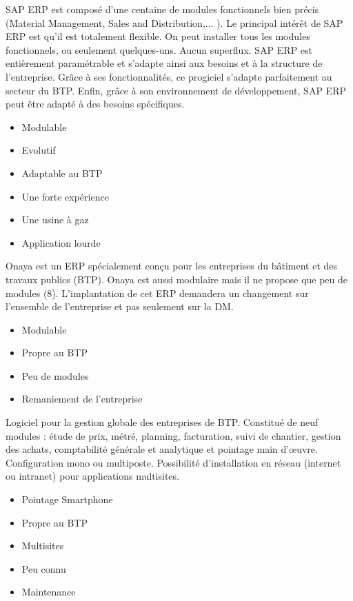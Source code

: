 {
    SAP ERP est composé d'une centaine de modules fonctionnels bien précis (Material Management, Sales and Distribution,... ).
    Le principal intérêt de SAP ERP est qu'il est totalement flexible. On peut installer tous les modules fonctionnels, ou seulement quelques-uns.
    Aucun superflux. SAP ERP est entièrement paramétrable et s'adapte ainsi aux besoins et à la structure de l'entreprise.
    Grâce à ses fonctionnalités, ce progiciel s'adapte parfaitement au secteur du BTP.
    Enfin, grâce à son environnement de développement, SAP ERP peut être adapté à des besoins spécifiques.
}
{
    \begin{itemize}
        \item Modulable
        \item Evolutif
        \item Adaptable au BTP
        \item Une forte expérience
    \end{itemize}
}
{
    \begin{itemize}
        \item Une usine à gaz
        \item Application lourde
    \end{itemize}
}



{
    Onaya est un ERP spécialement conçu pour les entreprises du bâtiment et des travaux publics (BTP).
    Onaya est aussi modulaire mais il ne propose que peu de modules (8).
    L'implantation de cet ERP demandera un changement sur l'ensemble de l'entreprise et pas seulement sur la DM.
}
{
    \begin{itemize}
        \item Modulable
        \item Propre au BTP
    \end{itemize}
}
{
    \begin{itemize}
        \item Peu de modules
        \item Remaniement de l'entreprise
    \end{itemize}
}

{
    Logiciel pour la gestion globale des entreprises de BTP. Constitué de neuf modules : étude de prix, métré, planning, facturation, suivi de chantier, gestion des achats, comptabilité générale et analytique et pointage main d'\oe uvre.
    Configuration mono ou multiposte. Possibilité d'installation en réseau (internet ou intranet) pour applications multisites.
}
{
    \begin{itemize}
      \item Pointage Smartphone
      \item Propre au BTP
      \item Multisites
    \end{itemize}
}
{
    \begin{itemize}
        \item Peu connu
        \item Maintenance%
    \end{itemize}
}

